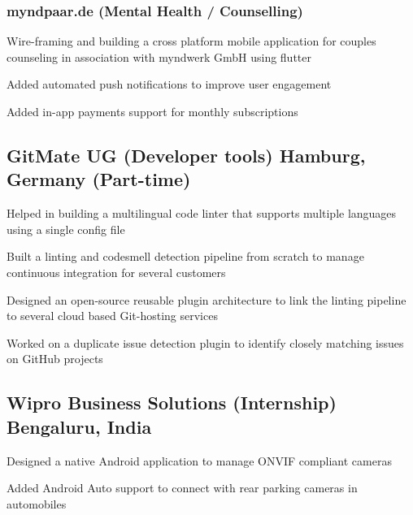 \subsubsection*{myndpaar.de (Mental Health / Counselling)}
\begin{zitemize}
    \item Wire-framing and building a cross platform mobile application for couples
    counseling in association with myndwerk GmbH using flutter
    \item Added automated push notifications to improve user engagement
    \item Added in-app payments support for monthly subscriptions
\end{zitemize}


\subsection{GitMate UG (Developer tools) \hfill Hamburg, Germany (Part-time)}
\begin{zitemize}
    \item Helped in building a multilingual code linter that supports multiple languages
    using a single config file
    \item Built a linting and codesmell detection pipeline from scratch to manage
    continuous integration for several customers
    \item Designed an open-source reusable plugin architecture to link the linting
    pipeline to several cloud based Git-hosting services
    \item Worked on a duplicate issue detection plugin to identify closely matching
    issues on GitHub projects
\end{zitemize}


\subsection{Wipro Business Solutions (Internship) \hfill Bengaluru, India}
\begin{zitemize}
    \item Designed a native Android application to manage ONVIF compliant cameras
    \item Added Android Auto support to connect with rear parking cameras in automobiles
\end{zitemize}

